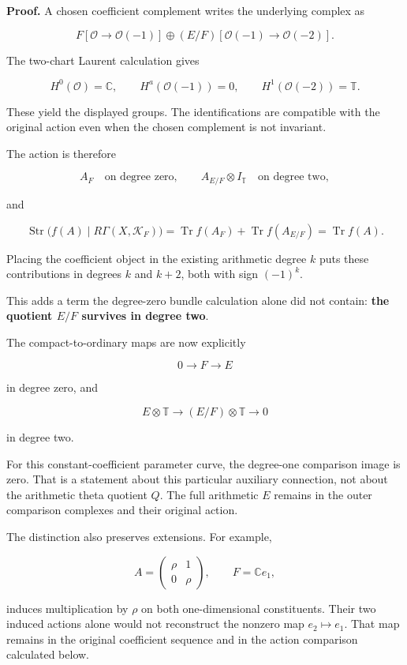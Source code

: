 \textbf{Proof.} A chosen coefficient complement writes the underlying complex as

\[
F[\mathcal O\to\mathcal O(-1)]
\oplus
(E/F)[\mathcal O(-1)\to\mathcal O(-2)].
\]

The two-chart Laurent calculation gives

\[
H^0(\mathcal O)=\mathbb C,\qquad
H^a(\mathcal O(-1))=0,\qquad
H^1(\mathcal O(-2))=\mathbb T.
\]

These yield the displayed groups. The identifications are compatible with the original action even when the chosen complement is not invariant.

The action is therefore

\[
A_F\quad\text{on degree zero},\qquad
A_{E/F}\otimes I_{\mathbb T}\quad\text{on degree two},
\]

and

\[
\boxed{
\operatorname{Str}\bigl(f(A)\mid R\Gamma(X,\mathcal K_F)\bigr)
=
\operatorname{Tr}f(A_F)+\operatorname{Tr}f(A_{E/F})
=
\operatorname{Tr}f(A).
}
\]

Placing the coefficient object in the existing arithmetic degree \(k\) puts these contributions in degrees \(k\) and \(k+2\), both with sign \((-1)^k\).

This adds a term the degree-zero bundle calculation alone did not contain: \textbf{the quotient \(E/F\) survives in degree two}.

The compact-to-ordinary maps are now explicitly

\[
0\longrightarrow F\longrightarrow E
\]

in degree zero, and

\[
E\otimes\mathbb T
\longrightarrow
(E/F)\otimes\mathbb T
\longrightarrow0
\]

in degree two.

For this constant-coefficient parameter curve, the degree-one comparison image is zero. That is a statement about this particular auxiliary connection, not about the arithmetic theta quotient \(Q\). The full arithmetic \(E\) remains in the outer comparison complexes and their original action.

The distinction also preserves extensions. For example,

\[
A=\begin{pmatrix}\rho&1\\0&\rho\end{pmatrix},
\qquad F=\mathbb Ce_1,
\]

induces multiplication by \(\rho\) on both one-dimensional constituents. Their two induced actions alone would not reconstruct the nonzero map \(e_2\mapsto e_1\). That map remains in the original coefficient sequence and in the action comparison calculated below.

